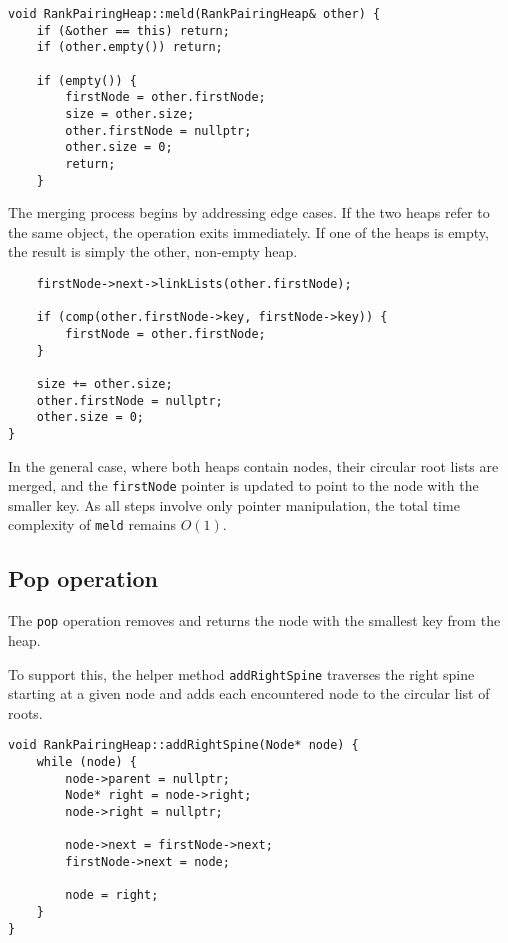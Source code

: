 \begin{verbatim}
void RankPairingHeap::meld(RankPairingHeap& other) {
    if (&other == this) return;
    if (other.empty()) return;

    if (empty()) {
        firstNode = other.firstNode;
        size = other.size;
        other.firstNode = nullptr;
        other.size = 0;
        return;
    }
\end{verbatim}

The merging process begins by addressing edge cases. If the two heaps refer to the same object, the operation exits immediately. If one of the heaps is empty, the result is simply the other, non-empty heap.

\begin{verbatim}
    firstNode->next->linkLists(other.firstNode);

    if (comp(other.firstNode->key, firstNode->key)) {
        firstNode = other.firstNode;
    }

    size += other.size;
    other.firstNode = nullptr;
    other.size = 0;
}
\end{verbatim}

In the general case, where both heaps contain nodes, their circular root lists are merged, and the \texttt{firstNode} pointer is updated to point to the node with the smaller key. As all steps involve only pointer manipulation, the total time complexity of \texttt{meld} remains \(O(1)\).

\subsection{Pop operation}

The \texttt{pop} operation removes and returns the node with the smallest key from the heap.

To support this, the helper method \texttt{addRightSpine} traverses the right spine starting at a given node and adds each encountered node to the circular list of roots.

\begin{verbatim}
void RankPairingHeap::addRightSpine(Node* node) {
    while (node) {
        node->parent = nullptr;
        Node* right = node->right;
        node->right = nullptr;
        
        node->next = firstNode->next;
        firstNode->next = node;
        
        node = right;
    }
}
\end{verbatim}

